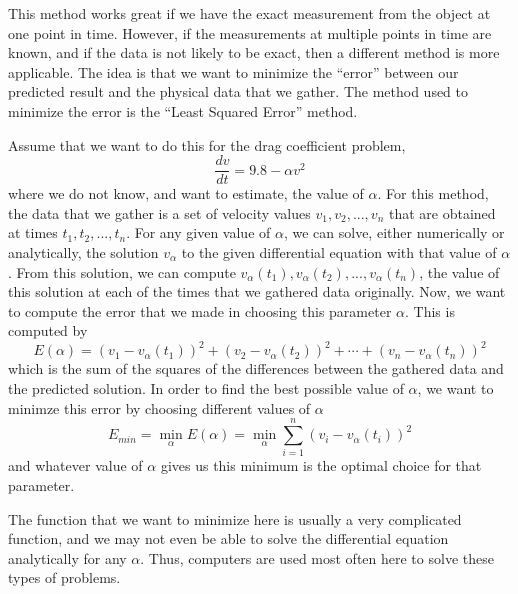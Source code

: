 \documentclass{ximera}
\begin{document}
This method works great if we have the exact measurement from the object at one point in time. However, if the measurements at multiple points in time are known, and if the data is not likely to be exact, then a different method is more applicable. The idea is that we want to minimize the ``error'' between our predicted result and the physical data that we gather. The method used to minimize the error is the ``Least Squared Error'' method.

Assume that we want to do this for the drag coefficient problem, 
\begin{equation*}
    \frac{dv}{dt} = 9.8 - \alpha v^2
\end{equation*}
where we do not know, and want to estimate, the value of $\alpha$. For this method, the data that we gather is a set of velocity values $v_1, v_2, ..., v_n$ that are obtained at times $t_1, t_2, ..., t_n$. For any given value of $\alpha$, we can solve, either numerically or analytically, the solution $v_\alpha$ to the given differential equation with that value of $\alpha$. From this solution, we can compute $v_\alpha(t_1), v_\alpha(t_2),..., v_\alpha(t_n)$, the value of this solution at each of the times that we gathered data originally. Now, we want to compute the error that we made in choosing this parameter $\alpha$. This is computed by 
\begin{equation*}
    E(\alpha) = (v_1 - v_\alpha(t_1))^2 + (v_2 - v_\alpha(t_2))^2 + \cdots  + (v_n - v_\alpha(t_n))^2
\end{equation*}
which is the sum of the squares of the differences between the gathered data and the predicted solution. In order to find the best possible value of $\alpha$, we want to minimze this error by choosing different values of $\alpha$
\begin{equation*}
    E_{min} = \min_\alpha E(\alpha) = \min_\alpha \sum_{i=1}^n (v_i - v_\alpha(t_i))^2
\end{equation*}
and whatever value of $\alpha$ gives us this minimum is the optimal choice for that parameter. 

The function that we want to minimize here is usually a very complicated function, and we may not even be able to solve the differential equation analytically for any $\alpha$. Thus, computers are used most often here to solve these types of problems.
\end{document}
